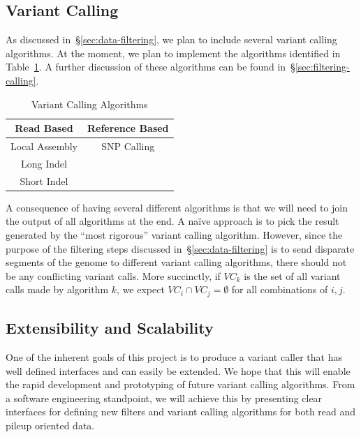 \documentclass[11pt]{article}
\begin{document}
\subsection{Variant Calling}
\label{sec:variant-calling}

As discussed in~\S\ref{sec:data-filtering}, we plan to include several variant calling algorithms. At the moment, we plan to
implement the algorithms identified in Table~\ref{tab:vc-algorithms}. A further discussion of these algorithms can be found
in~\S\ref{sec:filtering-calling}.

\begin{table}[h]
\begin{center}
\caption{Variant Calling Algorithms}
\label{tab:vc-algorithms}
\begin{tabular}{| c | c |}
\hline
\bf Read Based & \bf Reference Based \\
\hline \hline
Local Assembly & SNP Calling \\
Long Indel & \\
Short Indel & \\
\hline
\end{tabular}
\end{center}
\end{table}

A consequence of having several different algorithms is that we will need to join the output of all algorithms at the end.
A na\"{i}ve approach is to pick the result generated by the ``most rigorous'' variant calling algorithm. However, since the
purpose of the filtering steps discussed in~\S\ref{sec:data-filtering} is to send disparate segments of the genome to
different variant calling algorithms, there should not be any conflicting variant calls. More succinctly, if $VC_{k}$ is the
set of all variant calls made by algorithm $k$, we expect $VC_{i} \cap VC_{j} = \emptyset$ for all combinations of $i, j$.

\subsection{Extensibility and Scalability}
\label{sec:extensibility-and-scalability}

One of the inherent goals of this project is to produce a variant caller that has well defined interfaces and can easily be
extended. We hope that this will enable the rapid development and prototyping of future variant calling algorithms. From
a software engineering standpoint, we will achieve this by presenting clear interfaces for defining new filters and variant
calling algorithms for both read and pileup oriented data.
\end{document}
